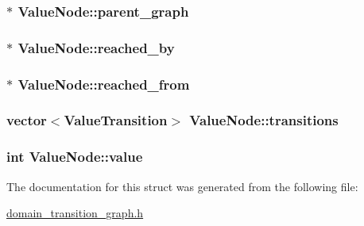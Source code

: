 \hypertarget{structValueNode_a057ccc4e572cb28a310f6ef84aad4e82}{
\subsubsection[{parent\-\_\-graph}]{$\ast$ Value\-Node\-::parent\-\_\-graph}}\label{structValueNode_a057ccc4e572cb28a310f6ef84aad4e82}
\hypertarget{structValueNode_a7ea5fd17a80694802c9485750d4b95f9}{
\subsubsection[{reached\-\_\-by}]{$\ast$ Value\-Node\-::reached\-\_\-by}}\label{structValueNode_a7ea5fd17a80694802c9485750d4b95f9}
\hypertarget{structValueNode_a4f8368899fd6bb99afedfb70d7f84c19}{
\subsubsection[{reached\-\_\-from}]{$\ast$ Value\-Node\-::reached\-\_\-from}}\label{structValueNode_a4f8368899fd6bb99afedfb70d7f84c19}
\hypertarget{structValueNode_a30d89efb6ce79877950e8dfc88ae171e}{
\subsubsection[{transitions}]{\setlength{\rightskip}{0pt plus 5cm}vector$<${\bf Value\-Transition}$>$ Value\-Node\-::transitions}}\label{structValueNode_a30d89efb6ce79877950e8dfc88ae171e}
\hypertarget{structValueNode_abc838c0ec99f92408713757aa4cf5f11}{
\subsubsection[{value}]{\setlength{\rightskip}{0pt plus 5cm}int Value\-Node\-::value}}\label{structValueNode_abc838c0ec99f92408713757aa4cf5f11}


The documentation for this struct was generated from the following file\-:\begin{DoxyCompactItemize}
\item 
\hyperlink{domain__transition__graph_8h}{domain\-\_\-transition\-\_\-graph.\-h}\end{DoxyCompactItemize}
